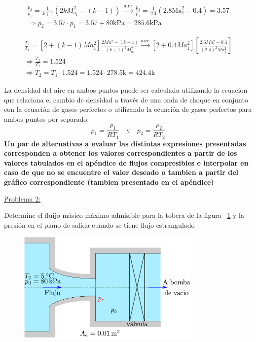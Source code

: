 \documentclass[11pt]{report}
\begin{document}
$$
\begin{array}{r}
\displaystyle \frac{p_{2}}{p_{1}}=\frac{1}{k+1}\left(2 k M_{a_{1}}^{2}-(k-1)\right) \stackrel{\text { aire }}{\longrightarrow} \frac{p_{2}}{p_{1}}=\frac{1}{2.4}\left(2.8 \mathrm{Ma}_{1}^{2}-0.4\right)=3.57 \\
\Rightarrow p_{2}=3.57 \cdot p_{1}=3.57+80 \mathrm{kPa}=285.6 \mathrm{kPa}
\end{array}
$$

$$
\begin{array}{r}
\displaystyle \frac{T_{2}}{T_{1}}=\left[2+(k-1) M a_{1}^{2}\right] \frac{2 Ma^{2}-(k-1)}{(k+1)^{2} M_{a_{1}}^{2}} \stackrel{aire}{\rightarrow}\left[2+0.4 Ma_{1}^{2}\right]\left[\frac{2.6 Ma_{1}^{2}-0.4}{(2.4)^{2} Ma_{1}^{2}}\right] \\ 
\displaystyle  \Rightarrow \frac{T_{2}}{T_{1}}=1.524 \\ 
\displaystyle \Rightarrow T_{2}=T_{1} \cdot 1.524=1.524 \cdot 278.5 \mathrm{k}=424.4 \mathrm{k}
\end{array}
$$

La densidad del aire en ambos puntos puede ser calculada utilizando la ecuacion que relaciona el cambio de densidad a trav\'es de una onda de choque en conjunto con la ecuaci\'on de gases perfectos o utilizando la ecuaci\'on de gases perfectos para ambos puntos por separado:
$$
\rho_{1}=\frac{p_{1}}{R T_{1}} \quad \text{y} \quad p_{2}=\frac{p_{2}}{R T_{2}}
$$
\textbf{Un par de alternativas a evaluar las distintas expresiones presentadas corresponden a obtener los valores correspondientes a partir de los valores tabulados en el ap\'endice de flujos compresibles e interpolar en caso de que no se encuentre el valor deseado o tambien a partir del gr\'afico correspondiente (tambien presentado en el ap\'endice)} 




\newpage

\underline {Problema 2:}
\vspace{0.2cm}

Determine el fluijo m\'asico m\'aximo admisible para la tobera de la figura ~\ref{fig:fig1} y la presi\'on en el plano de salida cuando se tiene flujo estrangulado
\begin{figure}[H]
\centering\includegraphics[width=0.8\textwidth]{Figures/tobera_conv.eps}
\caption{\label{fig:fig1} }
\end{figure}
\vspace{0.2cm}
\end{document}
